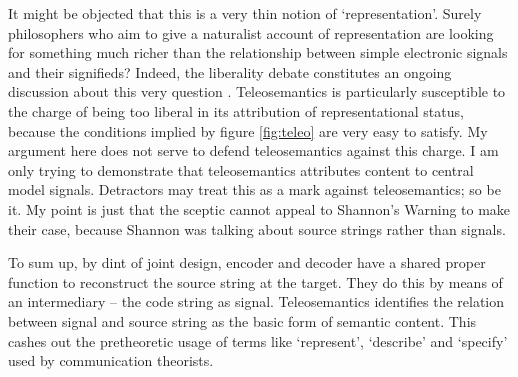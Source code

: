 It might be objected that this is a very thin notion of `representation'.
Surely philosophers who aim to give a naturalist account of representation are looking for something much richer than the relationship between simple electronic signals and their signifieds?
Indeed, the liberality debate constitutes an ongoing discussion about this very question \citep{artiga2016liberal,desouzafilho2022dual}.
Teleosemantics is particularly susceptible to the charge of being too liberal in its attribution of representational status, because the conditions implied by figure \ref{fig:teleo} are very easy to satisfy.
My argument here does not serve to defend teleosemantics against this charge.
I am only trying to demonstrate that teleosemantics attributes content to central model signals.
Detractors may treat this as a mark against teleosemantics; so be it.
My point is just that the sceptic cannot appeal to {\sc Shannon's Warning} to make their case, because Shannon was talking about source strings rather than signals.


To sum up, by dint of joint design, encoder and decoder have a shared proper function to reconstruct the source string at the target.
They do this by means of an intermediary -- the code string as signal.
Teleosemantics identifies the relation between signal and source string as the basic form of semantic content.
This cashes out the pretheoretic usage of terms like `represent', `describe' and `specify' used by communication theorists.


